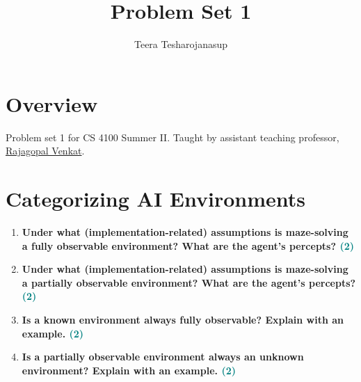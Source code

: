\documentclass[a4paper]{article}
\begin{document}
\title{\textbf{\huge{Problem Set 1}}}

\author{\textbf\large{Teera Tesharojanasup}}


\date{}

\maketitle
\begin{sloppypar}

\section*{Overview}

Problem set 1 for CS 4100 Summer II. Taught by assistant teaching professor, \href{https://rajagopalvenkat.com/}{Rajagopal Venkat}. \cite{MISC:1}

\section{Categorizing AI Environments}

\begin{enumerate}[start=1,label=Q\arabic*,left=0pt]
    \item \textbf{Under what (implementation-related) assumptions is maze-solving a fully observable environment? What are the agent’s percepts? \hfill \textcolor{teal}{(2)}}
    
    \par 
    
    \item \textbf{Under what (implementation-related) assumptions is maze-solving a partially observable environment? What are the agent’s percepts? \hfill \textcolor{teal}{(2)}}
    
    \par
    
    \item \textbf{Is a known environment always fully observable? Explain with an example. \hfill \textcolor{teal}{(2)}}
    
    \par
    
    \item \textbf{Is a partially observable environment always an unknown environment? Explain with an example. \hfill \textcolor{teal}{(2)}}
    
    \par 


\end{enumerate}
\end{sloppypar}
\end{document}
